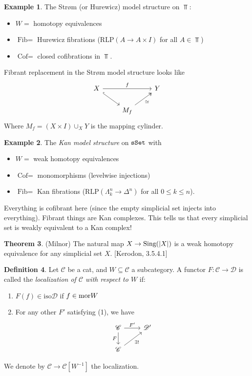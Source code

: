 \documentclass[12pt]{amsart}
\theoremstyle{definition}
\newtheorem{theorem}{Theorem}[section]
\newtheorem{definition}[theorem]{Definition}
\newtheorem{example}[theorem]{Example}
\providecommand{\Cof}{\text{Cof}}
\providecommand{\Fib}{\text{Fib}}
\providecommand{\RLP}{\text{RLP}}
\begin{document}
\begin{example} The Str{\o}m (or Hurewicz) model structure on $\Top$:
\begin{itemize}
    \item $W=$ homotopy equivalences
    \item $\Fib=$ Hurewicz fibrations ($\RLP(A \to A \times I)$ for all $A \in \Top$)
    \item $\Cof=$ closed cofibrations in $\Top$.
\end{itemize}
Fibrant replacement in the Str{\o}m model structure looks like
\[ \begin{tikzcd}
    X\ar[rr,"f"]\ar[dr,hook] &  & Y\\
     & M_f\ar[ur,two heads,"\simeq" below right] &
\end{tikzcd} \]
Where $M_f = (X \times I)\cup_X Y$ is the mapping cylinder.
\end{example}

\begin{example} The \textit{Kan model structure} on $\texttt{sSet}$ with
\begin{itemize}
    \item $W=$ weak homotopy equivalences
    \item $\Cof=$ monomorphisms (levelwise injections)
    \item $\Fib=$ Kan fibrations ($\RLP(\Lambda_k^n \to \Delta^n)$ for all $0\le k\le n$).
\end{itemize}
Everything is cofibrant here (since the empty simplicial set injects into everything). Fibrant things are Kan complexes. This tells us that every simplicial set is weakly equivalent to a Kan complex!
\end{example}

\begin{theorem} (Milnor) The natural map $X \to \text{Sing}(|X|)$ is a weak homotopy equivalence for any simplicial set $X$. [Kerodon, 3.5.4.1]
\end{theorem}


\begin{definition} Let $\mathscr{C}$ be a cat, and $W \subseteq \mathscr{C}$ a subcategory. A functor $F: \mathscr{C} \to \mathscr{D}$ is called the \textit{localization of $\mathscr{C}$ with respect to $W$} if:
\begin{enumerate}
    \item $F(f) \in \text{iso} \mathscr{D}$ if $f\in \text{mor} W$
    \item For any other $F'$ satisfying (1), we have
\[ \begin{tikzcd}
    \mathscr{C}\rar["F'"]\dar["F" left] & \mathscr{D}'\\
    \mathscr{C}\ar[ur,"\exists!" below right] & 
\end{tikzcd} \]
\end{enumerate}
We denote by $\mathscr{C} \to \mathscr{C}[W^{-1}]$ the localization.
\end{definition}
\end{document}
